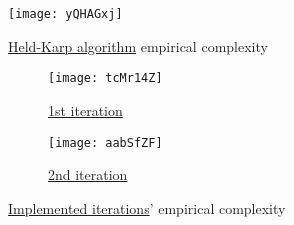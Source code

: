 \begin{figure}[H]
    \centering
    \texttt{[image: yQHAGxj]}
    \caption{\hyperref[algorithm-tsp-heldkarp]{Held-Karp algorithm} empirical complexity}
\end{figure}

\begin{figure}[H]
    \centering
    \begin{subfigure}{0.49\textwidth}
        \centering
        \texttt{[image: tcMr14Z]}
        \caption{\hyperref[iterations-1]{1st iteration}}
    \end{subfigure}
    \begin{subfigure}{0.49\textwidth}
        \centering
        \texttt{[image: aabSfZF]}
        \caption{\hyperref[iterations-2]{2nd iteration}}
    \end{subfigure}
    \caption{\hyperref[iterations]{Implemented iterations}' empirical complexity}
\end{figure}
